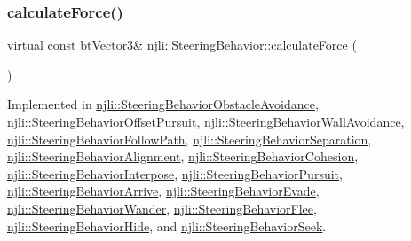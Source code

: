 \subsubsection{\texorpdfstring{calculate\+Force()}{calculateForce()}}
{\footnotesize\ttfamily virtual const bt\+Vector3\& njli\+::\+Steering\+Behavior\+::calculate\+Force (\begin{DoxyParamCaption}{ }\end{DoxyParamCaption})\hspace{0.3cm}{\ttfamily [pure virtual]}}



Implemented in \mbox{\hyperlink{classnjli_1_1_steering_behavior_obstacle_avoidance_addb96c5e33caceca8b524f9986090a78}{njli\+::\+Steering\+Behavior\+Obstacle\+Avoidance}}, \mbox{\hyperlink{classnjli_1_1_steering_behavior_offset_pursuit_ada03ab32f7f5b138d513da180af6213d}{njli\+::\+Steering\+Behavior\+Offset\+Pursuit}}, \mbox{\hyperlink{classnjli_1_1_steering_behavior_wall_avoidance_af699ece0ed7df8fb52274ff1bb74993a}{njli\+::\+Steering\+Behavior\+Wall\+Avoidance}}, \mbox{\hyperlink{classnjli_1_1_steering_behavior_follow_path_ac169340c95b5745648da76553a541708}{njli\+::\+Steering\+Behavior\+Follow\+Path}}, \mbox{\hyperlink{classnjli_1_1_steering_behavior_separation_ae969e8f68dcc47f17e67d096b19db4f1}{njli\+::\+Steering\+Behavior\+Separation}}, \mbox{\hyperlink{classnjli_1_1_steering_behavior_alignment_a57e0d628940b268bc9fbb5381b75c912}{njli\+::\+Steering\+Behavior\+Alignment}}, \mbox{\hyperlink{classnjli_1_1_steering_behavior_cohesion_a67060584a15bdf7b9c367d71304965c1}{njli\+::\+Steering\+Behavior\+Cohesion}}, \mbox{\hyperlink{classnjli_1_1_steering_behavior_interpose_a11c5d304f4459170a42b9c95b996d739}{njli\+::\+Steering\+Behavior\+Interpose}}, \mbox{\hyperlink{classnjli_1_1_steering_behavior_pursuit_a8b7df550e112b795f0e076873a99a86d}{njli\+::\+Steering\+Behavior\+Pursuit}}, \mbox{\hyperlink{classnjli_1_1_steering_behavior_arrive_ae878be98da62eef4bb606937e5e944e7}{njli\+::\+Steering\+Behavior\+Arrive}}, \mbox{\hyperlink{classnjli_1_1_steering_behavior_evade_aab18adfa89d35b3063f02a1fe9b22ac4}{njli\+::\+Steering\+Behavior\+Evade}}, \mbox{\hyperlink{classnjli_1_1_steering_behavior_wander_ae21123cbd677526e9860730511798f1a}{njli\+::\+Steering\+Behavior\+Wander}}, \mbox{\hyperlink{classnjli_1_1_steering_behavior_flee_a2f2eb808d8dd3d1792e7ff2916a02ac8}{njli\+::\+Steering\+Behavior\+Flee}}, \mbox{\hyperlink{classnjli_1_1_steering_behavior_hide_a767a29696376d90158523d2aa5fb13d7}{njli\+::\+Steering\+Behavior\+Hide}}, and \mbox{\hyperlink{classnjli_1_1_steering_behavior_seek_a513e5b0f1e677cae6af2446485a80c61}{njli\+::\+Steering\+Behavior\+Seek}}.

